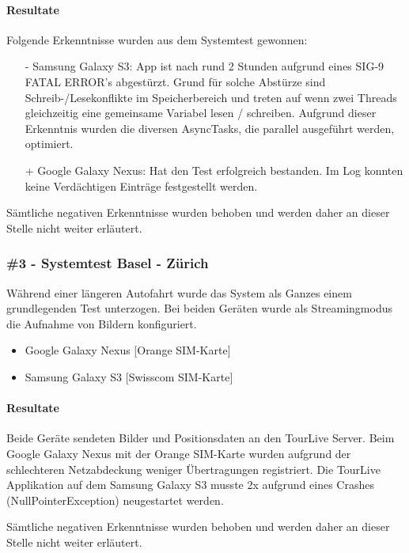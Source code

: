 \paragraph*{Resultate}
Folgende Erkenntnisse wurden aus dem Systemtest gewonnen:
\begin{itemize}
\item[-] Samsung Galaxy S3: App ist nach rund 2 Stunden aufgrund eines SIG-9 FATAL ERROR's abgestürzt. Grund für solche Abstürze sind Schreib-/Lesekonflikte im Speicherbereich und treten auf wenn zwei Threads gleichzeitig eine gemeinsame Variabel lesen / schreiben. Aufgrund dieser Erkenntnis wurden die diversen AsyncTasks, die parallel ausgeführt werden, optimiert.
\item[+] Google Galaxy Nexus: Hat den Test erfolgreich bestanden. Im Log konnten keine Verdächtigen Einträge festgestellt werden.
\end{itemize}
Sämtliche negativen Erkenntnisse wurden behoben und werden daher an dieser Stelle nicht weiter erläutert.



\subsubsection{\#3 - Systemtest Basel - Zürich}
Während einer längeren Autofahrt wurde das System als Ganzes einem grundlegenden Test unterzogen. Bei beiden Geräten wurde als Streamingmodus die Aufnahme von Bildern konfiguriert.

\begin{itemize} [noitemsep,topsep=0pt]
	\item Google Galaxy Nexus [Orange SIM-Karte]
	\item Samsung Galaxy S3 [Swisscom SIM-Karte]
\end{itemize}

\paragraph*{Resultate}
Beide Geräte sendeten Bilder und Positionsdaten an den TourLive Server. Beim Google Galaxy Nexus mit der Orange SIM-Karte wurden aufgrund der schlechteren Netzabdeckung weniger Übertragungen registriert. Die TourLive Applikation auf dem Samsung Galaxy S3 musste 2x aufgrund eines Crashes (NullPointerException) neugestartet werden.

Sämtliche negativen Erkenntnisse wurden behoben und werden daher an dieser Stelle nicht weiter erläutert.


